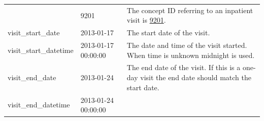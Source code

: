 \documentclass[11pt]{book}
\begin{document}
\begin{longtable}[]{@{}lll@{}}
\begin{minipage}[t]{0.28\columnwidth}
\end{minipage} & \begin{minipage}[t]{0.16\columnwidth}\raggedright\strut
9201\strut
\end{minipage} & \begin{minipage}[t]{0.48\columnwidth}\raggedright\strut
The concept ID referring to an inpatient visit is
\href{http://athena.ohdsi.org/search-terms/terms/9201}{9201}.\strut
\end{minipage}\tabularnewline
\begin{minipage}[t]{0.28\columnwidth}\raggedright\strut
visit\_start\_date\strut
\end{minipage} & \begin{minipage}[t]{0.16\columnwidth}\raggedright\strut
2013-01-17\strut
\end{minipage} & \begin{minipage}[t]{0.48\columnwidth}\raggedright\strut
The start date of the visit.\strut
\end{minipage}\tabularnewline
\begin{minipage}[t]{0.28\columnwidth}\raggedright\strut
visit\_start\_datetime\strut
\end{minipage} & \begin{minipage}[t]{0.16\columnwidth}\raggedright\strut
2013-01-17 00:00:00\strut
\end{minipage} & \begin{minipage}[t]{0.48\columnwidth}\raggedright\strut
The date and time of the visit started. When time is unknown midnight is
used.\strut
\end{minipage}\tabularnewline
\begin{minipage}[t]{0.28\columnwidth}\raggedright\strut
visit\_end\_date\strut
\end{minipage} & \begin{minipage}[t]{0.16\columnwidth}\raggedright\strut
2013-01-24\strut
\end{minipage} & \begin{minipage}[t]{0.48\columnwidth}\raggedright\strut
The end date of the visit. If this is a one-day visit the end date
should match the start date.\strut
\end{minipage}\tabularnewline
\begin{minipage}[t]{0.28\columnwidth}\raggedright\strut
visit\_end\_datetime\strut
\end{minipage} & \begin{minipage}[t]{0.16\columnwidth}\raggedright\strut
2013-01-24 00:00:00\strut
\end{minipage} & \begin{minipage}[t]{0.48\columnwidth}\raggedright\strut

\end{minipage}
\end{longtable}
\end{document}
